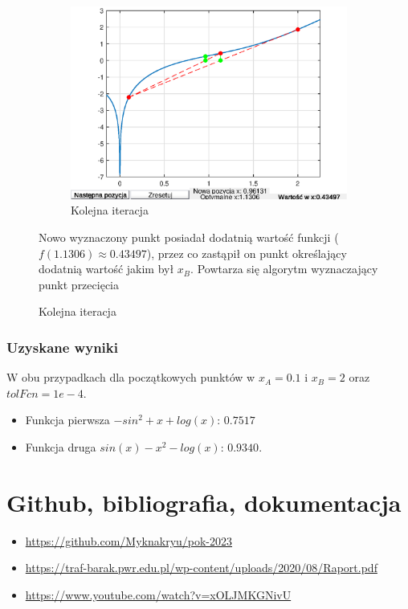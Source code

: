 \documentclass{article}
\begin{document}
\begin{figure}[H]
    \begin{multicols}{2}
        \begin{figure}[H]
            \centering
            \includegraphics[width=\linewidth]{img/falsi1.eps}
        \caption{Kolejna iteracja}
            \label{fig:my_label}
        \end{figure}
        \par
        \null \vfill
        Nowo wyznaczony punkt posiadał dodatnią wartość funkcji ($f(1.1306) \approx 0.43497$), przez co zastąpił on punkt określający dodatnią wartość jakim był $x_B$. Powtarza się algorytm wyznaczający punkt przecięcia
        \vfill \null
    \end{multicols}
\end{figure}
\subsubsection{Uzyskane wyniki}
W obu przypadkach dla początkowych punktów w $x_A = 0.1$ i $x_B = 2$ oraz $tolFcn = 1e-4$.
\begin{itemize}
    \item Funkcja pierwsza $-sin^2  + x + log(x)$: $0.7517$
    \item Funkcja druga $sin(x) - x^2 - log(x)$: $0.9340$.
\end{itemize}
\section{Github, bibliografia, dokumentacja}
\begin{itemize}
    \item \url{https://github.com/Myknakryu/pok-2023}
    \item \url{https://traf-barak.pwr.edu.pl/wp-content/uploads/2020/08/Raport.pdf}
    \item \url{https://www.youtube.com/watch?v=xOLJMKGNivU}
\end{itemize}
\end{document}
